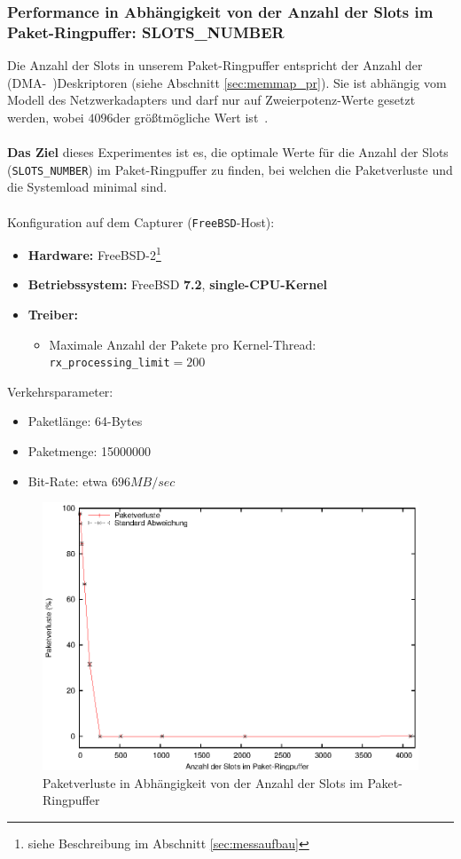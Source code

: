 \subsubsection*{Performance in Abhängigkeit von der Anzahl der Slots im  Paket-Ringpuffer: SLOTS\_NUMBER}
Die Anzahl der Slots in unserem Paket-Ringpuffer entspricht der Anzahl der
(DMA-~)Deskriptoren (siehe Abschnitt \ref{sec:memmap_pr}). Sie ist abhängig vom
Modell des Netzwerkadapters und darf nur auf Zweierpotenz-Werte gesetzt
werden, wobei $4096$der größtmögliche Wert ist~\cite{e1000_sdm}.\\\\
%
\textbf{Das Ziel} dieses Experimentes ist es, die optimale Werte für die 
Anzahl der Slots (\verb+SLOTS_NUMBER+) im Paket-Ringpuffer zu finden, 
bei welchen die Paketverluste und die Systemload minimal sind.\\\\
%
Konfiguration auf dem Capturer (\verb+FreeBSD+-Host): 
\begin{itemize}
	\item \textbf{Hardware:} FreeBSD-2\footnote{siehe Beschreibung im Abschnitt \ref{sec:messaufbau}}
	\item \textbf{Betriebssystem:} FreeBSD \textbf{7.2}, \textbf{single-CPU-Kernel}
	\item \textbf{Treiber:} 
		\begin{itemize}
			\item Maximale Anzahl der Pakete pro Kernel-Thread: \\ \verb+rx_processing_limit+$=200$
		\end{itemize}
\end{itemize}
Verkehrsparameter:
\begin{itemize}
	\item Paketlänge: 64-Bytes
	\item Paketmenge: 15000000
	\item Bit-Rate: etwa $696MB/sec$
\end{itemize}
\begin{figure} 
\centering \includegraphics[width=5.5in]{plots/graphs/pktlos_single_bufsize.eps}
\caption{Paketverluste in Abhängigkeit von der Anzahl der Slots im Paket-Ringpuffer}
\label{img:plot_pktlos_puffs}
\end{figure}
